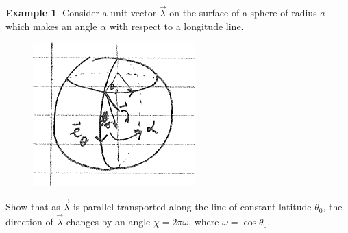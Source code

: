 \documentclass{book}
\theoremstyle{definition}
\newtheorem{exmp}{Example}[section]
\begin{document}
\begin{exmp}
	Consider a unit vector $\vec{\lambda}$ on the surface of a sphere of radius $a$ which makes an angle $\alpha$ with respect to a longitude line. 
	\begin{figure}[!htb]
		\centering
		\includegraphics[scale=0.7]{partrans}
	\end{figure}
	Show that as $\vec{\lambda}$ is parallel transported along the line of constant latitude $\theta_0$, the direction of $\vec{\lambda}$ changes by an angle $\chi = 2\pi \omega$, where $\omega = \cos\theta_0$. \\
	

\end{exmp}
\end{document}
